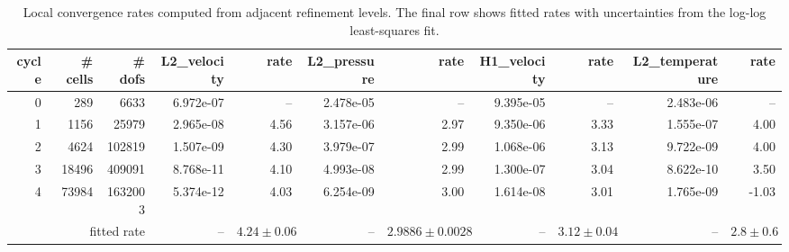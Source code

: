 \begin{table}[htbp]
\centering
\begin{tabular}{|r|r|r|r|r|r|r|r|r|r|r|}
\hline
cycle & \# cells & \# dofs & L2\_velocity & rate & L2\_pressure & rate & H1\_velocity & rate & L2\_temperature & rate \\ \hline
0 & 289 & 6633 & 6.972e-07 & -- & 2.478e-05 & -- & 9.395e-05 & -- & 2.483e-06 & -- \\ \hline
1 & 1156 & 25979 & 2.965e-08 & 4.56 & 3.157e-06 & 2.97 & 9.350e-06 & 3.33 & 1.555e-07 & 4.00 \\ \hline
2 & 4624 & 102819 & 1.507e-09 & 4.30 & 3.979e-07 & 2.99 & 1.068e-06 & 3.13 & 9.722e-09 & 4.00 \\ \hline
3 & 18496 & 409091 & 8.768e-11 & 4.10 & 4.993e-08 & 2.99 & 1.300e-07 & 3.04 & 8.622e-10 & 3.50 \\ \hline
4 & 73984 & 1632003 & 5.374e-12 & 4.03 & 6.254e-09 & 3.00 & 1.614e-08 & 3.01 & 1.765e-09 & -1.03 \\ \hline
\multicolumn{3}{|r|}{fitted rate} & -- & $4.24 \pm 0.06$ & -- & $2.9886 \pm 0.0028$ & -- & $3.12 \pm 0.04$ & -- & $2.8 \pm 0.6$ \\ \hline
\end{tabular}
\caption{Local convergence rates computed from adjacent refinement levels. The final row shows fitted rates with uncertainties from the log-log least-squares fit.}
\end{table}
